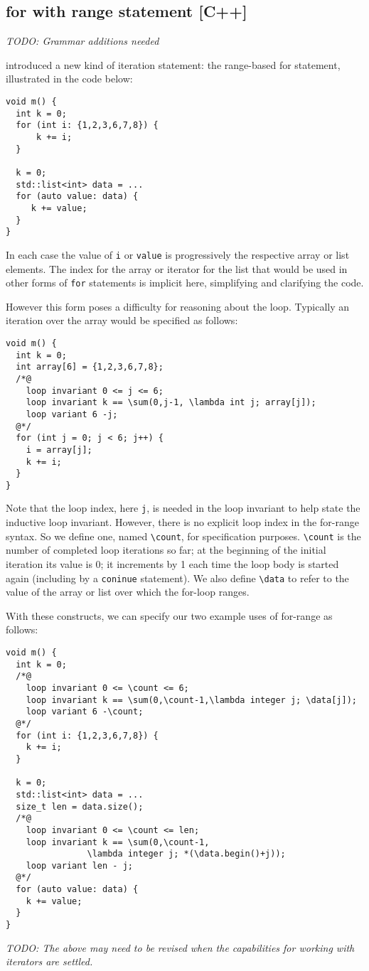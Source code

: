 \subsection{for with range statement [C++]}

\emph{TODO: Grammar additions needed}

\lang{} introduced a new kind of iteration statement: the range-based for statement, illustrated in the code below:
\begin{lstlisting}
void m() {
  int k = 0;
  for (int i: {1,2,3,6,7,8}) {
      k += i;
  }
  
  k = 0;
  std::list<int> data = ...
  for (auto value: data) {
     k += value;
  }
}
\end{lstlisting}

In each case the value of \lstinline|i| or \lstinline|value| is progressively the respective array or list elements. The  
index for the array or iterator for the list that would be used in other forms of \lstinline|for| statements is implicit here, simplifying and
clarifying the code.

However this form poses a difficulty for reasoning about the loop. Typically an iteration over the array would be specified as follows:
\begin{lstlisting}
void m() {
  int k = 0;
  int array[6] = {1,2,3,6,7,8};
  /*@
    loop invariant 0 <= j <= 6;
    loop invariant k == \sum(0,j-1, \lambda int j; array[j]);
    loop variant 6 -j;
  @*/
  for (int j = 0; j < 6; j++) {
    i = array[j];
    k += i;
  }
}
\end{lstlisting}

Note that the loop index, here \lstinline|j|, is needed in the loop invariant to help state the inductive loop invariant. However, there is no explicit loop index in the
for-range syntax. So we define one, named \lstinline|\count|, for specification purposes.
\lstinline|\count| is the number of completed loop iterations so far; 
at the beginning of the initial iteration its value is 0; it 
increments by 1 each time the loop body is started again (including by a
\lstinline|coninue| statement).
We also define \lstinline|\data| to refer to the value of the array or list over which the for-loop ranges.

With these constructs, we can specify our two example uses of for-range as follows:
\begin{lstlisting}
void m() {
  int k = 0;
  /*@
    loop invariant 0 <= \count <= 6;
    loop invariant k == \sum(0,\count-1,\lambda integer j; \data[j]);
    loop variant 6 -\count;
  @*/
  for (int i: {1,2,3,6,7,8}) {
    k += i;
  }

  k = 0;
  std::list<int> data = ...
  size_t len = data.size();
  /*@
    loop invariant 0 <= \count <= len;
    loop invariant k == \sum(0,\count-1,
                \lambda integer j; *(\data.begin()+j));
    loop variant len - j;
  @*/
  for (auto value: data) {
    k += value;
  }
}
\end{lstlisting}

\emph{TODO: The above may need to be revised when the capabilities for working with iterators are settled.}

